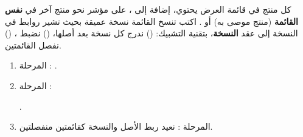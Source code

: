 \begin{statement}
كل منتج في قائمة العرض يحتوي، إضافة إلى ، على مؤشر  نحو منتج آخر في \textbf{نفس القائمة} (منتج موصى به) أو . اكتب  تنسخ القائمة نسخة عميقة بحيث تشير روابط  في النسخة إلى عقد \textbf{النسخة}، بتقنية التشبيك: () ندرج كل نسخة بعد أصلها، () نضبط ، () نفصل القائمتين.
\end{statement}
\begin{stepsbox}\begin{enumerate}
\item المرحلة : .
\item المرحلة : \par{\centering\small{}\par}.
\item المرحلة : نعيد ربط الأصل والنسخة كقائمتين منفصلتين.
\end{enumerate}\end{stepsbox}
